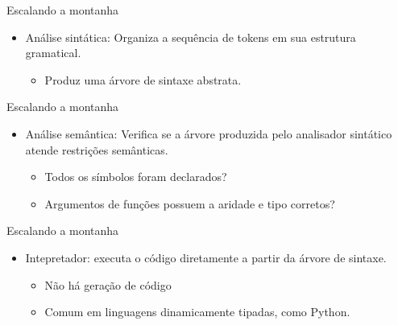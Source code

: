 \begin{frame}{Escalando a montanha}

    \begin{itemize}

        \item
        Análise sintática: Organiza a sequência de tokens em sua estrutura
        gramatical.

        \begin{itemize}

            \item
            Produz uma árvore de sintaxe abstrata.
        \end{itemize}
    \end{itemize}
\end{frame}

\begin{frame}{Escalando a montanha}

    \begin{itemize}

        \item
        Análise semântica: Verifica se a árvore produzida pelo analisador
        sintático atende restrições semânticas.

        \begin{itemize}

            \item
            Todos os símbolos foram declarados?
            \item
            Argumentos de funções possuem a aridade e tipo corretos?
        \end{itemize}
    \end{itemize}
\end{frame}

\begin{frame}{Escalando a montanha}

    \begin{itemize}

        \item
        Intepretador: executa o código diretamente a partir da árvore de
        sintaxe.

        \begin{itemize}

            \item
            Não há geração de código
            \item
            Comum em linguagens dinamicamente tipadas, como Python.
        \end{itemize}
    \end{itemize}
\end{frame}

